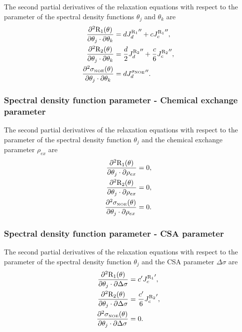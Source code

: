 The second partial derivatives of the relaxation equations with respect to the parameter of the spectral density functions $\theta_j$ and $\theta_k$ are
\begin{align}
    \frac{\partial^2 \mathrm{R}_1(\theta)}{\partial \theta_j \cdot \partial \theta_k} &= d {J_d^{\mathrm{R}_1}}'' + c {J_c^{\mathrm{R}_1}}'',                      \label{eq: Ri': d2R1/dmfj.dmfk} \\
    \frac{\partial^2 \mathrm{R}_2(\theta)}{\partial \theta_j \cdot \partial \theta_k} &= \frac{d}{2} {J_d^{\mathrm{R}_2}}'' + \frac{c}{6} {J_c^{\mathrm{R}_2}}'',  \label{eq: Ri': d2R2/dmfj.dmfk} \\
    \frac{\partial^2 \sigma_{\scriptscriptstyle \mathrm{NOE}}(\theta)}{\partial \theta_j \cdot \partial \theta_k} &= d {J_d^{\sigma_{\scriptscriptstyle \mathrm{NOE}}}}''.                          \label{eq: Ri': d2sigmaNOE/dmfj.dmfk}
\end{align}


\subsubsection{Spectral density function parameter - Chemical exchange parameter}

The second partial derivatives of the relaxation equations with respect to the parameter of the spectral density function $\theta_j$ and the chemical exchange parameter $\rho_{ex}$ are
\begin{align}
    \frac{\partial^2 \mathrm{R}_1(\theta)}{\partial \theta_j \cdot \partial \rho_{ex}} &= 0,        \label{eq: Ri': d2R1/dmfj.dRex} \\
    \frac{\partial^2 \mathrm{R}_2(\theta)}{\partial \theta_j \cdot \partial \rho_{ex}} &= 0,        \label{eq: Ri': d2R2/dmfj.dRex} \\
    \frac{\partial^2 \sigma_{\scriptscriptstyle \mathrm{NOE}}(\theta)}{\partial \theta_j \cdot \partial \rho_{ex}} &= 0. \label{eq: Ri': d2sigmaNOE/dmfj.dRex}
\end{align}


\subsubsection{Spectral density function parameter - CSA parameter}

The second partial derivatives of the relaxation equations with respect to the parameter of the spectral density function $\theta_j$ and the CSA parameter $\Delta\sigma$ are
\begin{align}
    \frac{\partial^2 \mathrm{R}_1(\theta)}{\partial \theta_j \cdot \partial \Delta\sigma} &= c' {J_c^{\mathrm{R}_1}}',            \label{eq: Ri': d2R1/dmfj.dCSA} \\
    \frac{\partial^2 \mathrm{R}_2(\theta)}{\partial \theta_j \cdot \partial \Delta\sigma} &= \frac{c'}{6} {J_c^{\mathrm{R}_2}}',  \label{eq: Ri': d2R2/dmfj.dCSA} \\
    \frac{\partial^2 \sigma_{\scriptscriptstyle \mathrm{NOE}}(\theta)}{\partial \theta_j \cdot \partial \Delta\sigma} &= 0.                   \label{eq: Ri': d2sigmaNOE/dmfj.dCSA}
\end{align}


